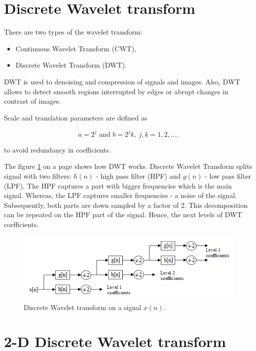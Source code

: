 \section{Discrete Wavelet transform}
There are two types of the wavelet transform:
\begin{itemize}
\item Continuous Wavelet Transform (CWT),
\item Discrete Wavelet Transform (DWT).
\end{itemize}

DWT is used to denoising and compression of signals and images. Also, DWT allows to detect smooth regions interrupted by edges or abrupt changes in contrast of images.

Scale and translation parameters are defined as

\begin{equation}
a = 2^j \text{ and } b = 2^j k,\ j,k=1,2,\ldots.
\end{equation}

to avoid redundancy in coefficients.


The figure \ref{fig:DWT} on a page \pageref{fig:DWT} shows how DWT works. Discrete Wavelet Transform splits signal with two filters: $h(n)$ - high pass filter (HPF) and $g(n)$ - low pass filter (LPF). The HPF captures a part with bigger frequencies which is the main signal. Whereas, the LPF captures smaller frequencies - a noise of the signal. Subsequently, both parts are down sampled by a factor of 2. This decomposition can be repeated on the HPF part of the signal. Hence, the next levels of DWT coefficients.

\begin{figure}[h]
	\centering
	\includegraphics[width=\textwidth]{DWT.png}
	\caption{Discrete Wavelet transform on a signal $x(n)$.}
	\label{fig:DWT}
\end{figure}


\section{2-D Discrete Wavelet transform}


